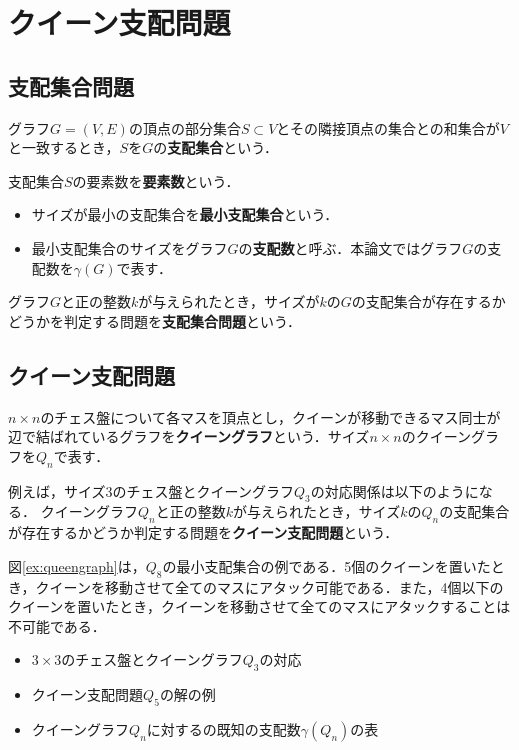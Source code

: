 \chapter{クイーン支配問題}\label{chap:background}

\section{支配集合問題}
グラフ$G=(V,E)$の頂点の部分集合$S\subset V$とその隣接頂点の集合との和集合が$V$と一致するとき，$S$を$G$の\textbf{支配集合}という．\par
支配集合$S$の要素数を\textbf{要素数}という．
 \begin{itemize}
  \item サイズが最小の支配集合を\textbf{最小支配集合}という．
  \item 最小支配集合のサイズをグラフ$G$の\textbf{支配数}と呼ぶ．本論文ではグラフ$G$の支配数を$\gamma(G)$で表す．
 \end{itemize}
  グラフ$G$と正の整数$k$が与えられたとき，サイズが$k$の$G$の支配集合が存在するかどうかを判定する問題を\textbf{支配集合問題}という．
\section{クイーン支配問題}
$n\times n$のチェス盤について各マスを頂点とし，クイーンが移動できるマス同士が辺で結ばれているグラフを\textbf{クイーングラフ}という．サイズ$n\times n$のクイーングラフを$Q_n$で表す．\par
例えば，サイズ3のチェス盤とクイーングラフ$Q_3$の対応関係は以下のようになる．
クイーングラフ$Q_n$と正の整数$k$が与えられたとき，サイズ$k$の$Q_n$の支配集合が存在するかどうか判定する問題を\textbf{クイーン支配問題}という．\par
図\ref{ex:queengraph}は，$Q_8$の最小支配集合の例である．5個のクイーンを置いたとき，クイーンを移動させて全てのマスにアタック可能である．また，4個以下のクイーンを置いたとき，クイーンを移動させて全てのマスにアタックすることは不可能である．


\begin{huge}
  \begin{itemize}
  \item $3\times 3$のチェス盤とクイーングラフ$Q_3$の対応
  \item クイーン支配問題$Q_5$の解の例
  \item クイーングラフ$Q_n$に対するの既知の支配数$\gamma(Q_n)$の表
  \end{itemize}
\end{huge}


